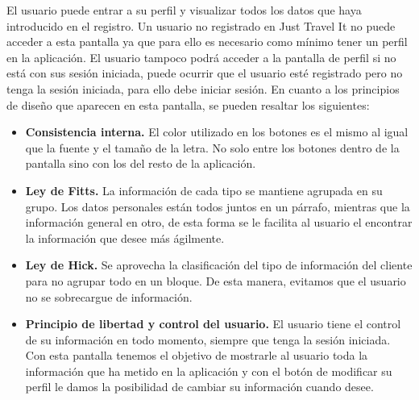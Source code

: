 El usuario puede entrar a su perfil y visualizar todos los datos que haya introducido en el
registro. Un usuario no registrado en Just Travel It no puede acceder a esta pantalla ya que
para ello es necesario como mínimo tener un perfil en la aplicación. El usuario tampoco podrá
acceder a la pantalla de perfil si no está con sus sesión iniciada, puede ocurrir que el usuario
esté registrado pero no tenga la sesión iniciada, para ello debe iniciar sesión. En cuanto a los
principios de diseño que aparecen en esta pantalla, se pueden resaltar los siguientes:

\begin{itemize}
    \item \textbf{Consistencia interna.} El color utilizado en los botones es el mismo al igual
        que la fuente y el tamaño de la letra. No solo entre los botones dentro de la pantalla
        sino con los del resto de la aplicación.
    \item \textbf{Ley de Fitts.} La información de cada tipo se mantiene agrupada en su grupo. Los
        datos personales están todos juntos en un párrafo, mientras que la información general
        en otro, de esta forma se le facilita al usuario el encontrar la información que desee
        más ágilmente.
    \item \textbf{Ley de Hick.} Se aprovecha la clasificación del tipo de información del cliente para no
        agrupar todo en un bloque. De esta manera, evitamos que el usuario no se sobrecargue de
        información.
    \item \textbf{Principio de libertad y control del usuario.} El usuario tiene el control de su
        información en todo momento, siempre que tenga la sesión iniciada. Con esta pantalla
        tenemos el objetivo de mostrarle al usuario toda la información que ha metido en la
        aplicación y con el botón de modificar su perfil le damos la posibilidad de cambiar su
        información cuando desee.
\end{itemize}